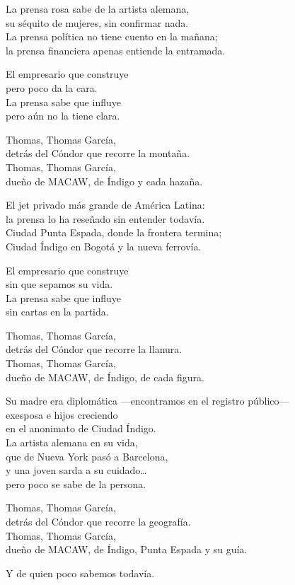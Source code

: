 \begin{lyrics}
La prensa rosa sabe de la artista alemana,\\
su séquito de mujeres, sin confirmar nada.\\
La prensa política no tiene cuento en la mañana;\\
la prensa financiera apenas entiende la entramada.

El empresario que construye\\
pero poco da la cara.\\
La prensa sabe que influye\\
pero aún no la tiene clara.

Thomas, Thomas García,\\
detrás del Cóndor que recorre la montaña.\\
Thomas, Thomas García,\\
dueño de MACAW, de Índigo y cada hazaña.

El jet privado más grande de América Latina:\\
la prensa lo ha reseñado sin entender todavía.\\
Ciudad Punta Espada, donde la frontera termina;\\
Ciudad Índigo en Bogotá y la nueva ferrovía.

El empresario que construye\\
sin que sepamos su vida.\\
La prensa sabe que influye\\
sin cartas en la partida.

Thomas, Thomas García,\\
detrás del Cóndor que recorre la llanura.\\
Thomas, Thomas García,\\
dueño de MACAW, de Índigo, de cada figura.

Su madre era diplomática
—encontramos en el registro público—\\
exesposa e hijos creciendo\\
en el anonimato de Ciudad Índigo.\\
La artista alemana en su vida,\\
que de Nueva York pasó a Barcelona,\\
y una joven sarda a su cuidado…\\
pero poco se sabe de la persona.

Thomas, Thomas García,\\
detrás del Cóndor que recorre la geografía.\\
Thomas, Thomas García,\\
dueño de MACAW, de Índigo, Punta Espada y su guía.

Y de quien poco sabemos todavía.
\end{lyrics}


